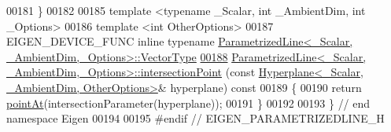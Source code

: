 \begin{DoxyCode}
00181 \}
00182 
00185 \textcolor{keyword}{template} <\textcolor{keyword}{typename} \_Scalar, \textcolor{keywordtype}{int} \_AmbientDim, \textcolor{keywordtype}{int} \_Options>
00186 \textcolor{keyword}{template} <\textcolor{keywordtype}{int} OtherOptions>
00187 EIGEN\_DEVICE\_FUNC \textcolor{keyword}{inline} \textcolor{keyword}{typename} 
      \hyperlink{group___core___module}{ParametrizedLine<\_Scalar, \_AmbientDim,\_Options>::VectorType}
\hyperlink{group___geometry___module_a9319102677fc48d2208c949f448f4829}{00188} \hyperlink{group___geometry___module_a9319102677fc48d2208c949f448f4829}{ParametrizedLine<\_Scalar, \_AmbientDim,\_Options>::intersectionPoint}
      (\textcolor{keyword}{const} \hyperlink{group___geometry___module_class_eigen_1_1_hyperplane}{Hyperplane<\_Scalar, \_AmbientDim, OtherOptions>}& 
      hyperplane)\textcolor{keyword}{ const}
00189 \textcolor{keyword}{}\{
00190   \textcolor{keywordflow}{return} \hyperlink{group___geometry___module_ae0a510cc78156974ab5a7fb8a6b2326a}{pointAt}(intersectionParameter(hyperplane));
00191 \}
00192 
00193 \} \textcolor{comment}{// end namespace Eigen}
00194 
00195 \textcolor{preprocessor}{#endif // EIGEN\_PARAMETRIZEDLINE\_H}
\end{DoxyCode}
